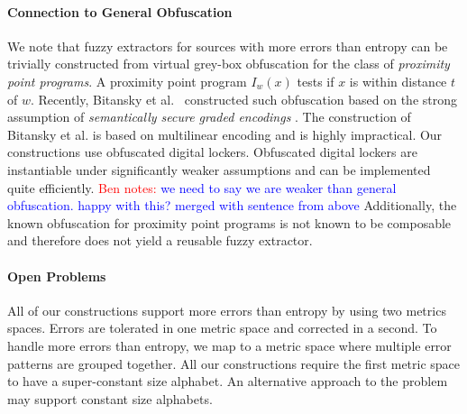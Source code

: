 \documentclass[11pt]{article}
\newcommand{\consref}[1]{\mbox{Construction~\ref{#1}}}
\newcommand{\class}[1]{{\ensuremath{\mathsf{#1}}}}
\newcommand{\gen}{\ensuremath{\class{Gen}}\xspace}
\newcommand{\authnote}[2]{{\textcolor{red}{\textsf{#1 notes: }\textcolor{blue}{ #2}}\marginpar{\textcolor{red}{\textbf{!!!!!}}}}}
\newcommand{\authnote}[2]{}
\newcommand{\bnote}[1]{{\authnote{Ben}{#1}}}
\begin{document}


\paragraph{Connection to General Obfuscation}
We note that fuzzy extractors for sources with more errors than entropy can be trivially constructed from virtual grey-box obfuscation for the class of {\em proximity point programs}. A proximity point program $I_w(x)$ tests if $x$ is within distance $t$ of $w$. 
Recently, Bitansky et al.~\cite{BitanskyCKP14} constructed such obfuscation based on the strong assumption of {\em semantically secure graded encodings} \cite{PassTS13}.
The construction of Bitansky et al. is based on multilinear encoding and is  highly impractical.  Our constructions use obfuscated digital lockers.  Obfuscated digital lockers are instantiable under significantly weaker assumptions and can be implemented quite efficiently.
\bnote{we need to say we are weaker than general obfuscation.  happy with this? merged with sentence from above}
Additionally, the known obfuscation for proximity point programs is not known to be composable and therefore does not yield a reusable fuzzy extractor.

\paragraph{Open Problems}
All of our constructions support more errors than entropy by using two metrics spaces.  Errors are tolerated in one metric space and corrected in a second.  To handle more errors than entropy,  we map to a metric space where multiple error patterns are grouped together.  All our constructions require the first metric space to have a super-constant size alphabet.  An alternative approach to the problem may support constant size alphabets.
\end{document}

